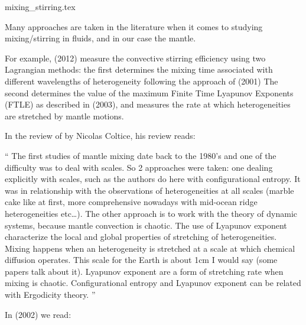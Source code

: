 \begin{flushright} {\tiny {\color{gray} mixing\_stirring.tex}} \end{flushright}

Many approaches are taken in the literature when it comes 
to studying mixing/stirring in fluids, and in our case the mantle.

For example, \textcite{sato12} (2012) 
measure the convective stirring efficiency using two Lagrangian methods: 
the first determines the mixing time associated with
different wavelengths of heterogeneity following the approach of \textcite{feri01} (2001)
The second determines the value of
the maximum Finite Time Lyapunov Exponents (FTLE) as described in 
\textcite{fasa03} (2003), and measures the rate at
which heterogeneities are stretched by mantle motions.

In the review of \textcite{vavt24} by Nicolas Coltice, his review reads:
\begin{displayquote}
{\color{darkgray}
``
The first studies of mantle mixing date back to the 1980’s and one of the 
difficulty was to deal with scales. So 2 approaches were taken: one dealing explicitly 
with scales, such as the authors do here with configurational entropy. It was in 
relationship with the observations of heterogeneities at all scales (marble cake like at 
first, more comprehensive nowadays with mid-ocean ridge heterogeneities etc…). 
The other approach is to work with the theory of dynamic systems, because mantle convection 
is chaotic. The use of Lyapunov exponent characterize the local and global properties of 
stretching of heterogeneities. Mixing happens when an heterogeneity is stretched at a 
scale at which chemical diffusion operates. This scale for the Earth is about 1cm I 
would say (some papers talk about it). Lyapunov exponent are a form of stretching rate 
when mixing is chaotic. Configurational entropy and Lyapunov exponent can be related 
with Ergodicity theory. 
''
}
\end{displayquote}





In \textcite{taxi02} (2002) we read: 

